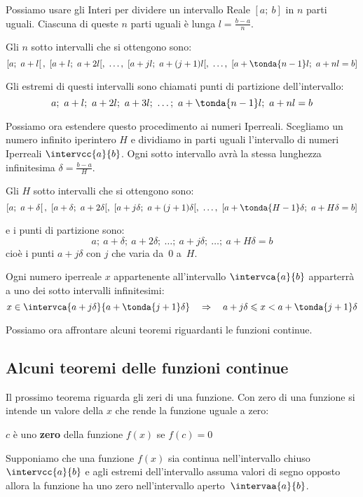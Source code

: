 Possiamo usare gli Interi per dividere un intervallo Reale \([a;~b]\)
in \(n\) parti uguali. Ciascuna di queste \(n\) parti 
uguali è lunga \(l=\frac{b-a}{n}\).

Gli \(n\) sotto intervalli che si ottengono sono:
\[\left[a;~a+l \right[,~[a+l;~a+2l[,~\dots,~
[a+jl;~a+(j+1)l[,~\dots,~
[a+\tonda{n-1}l;~a+nl=b]\]

Gli estremi di questi intervalli sono chiamati punti di partizione 
dell'intervallo:
\[a;~a+l;~a+2l;~a+3l;~\dots;~a+\tonda{n-1}l;~a+nl=b\]

Possiamo ora estendere questo procedimento ai numeri Iperreali.
Scegliamo un numero infinito iperintero \(H\) e dividiamo in parti 
uguali l'intervallo di numeri Iperreali \(\intervcc{a}{b}\). Ogni 
sotto intervallo avrà la stessa lunghezza infinitesima \(\delta=\frac{b-a}{H}\).

Gli \(H\) sotto intervalli che si ottengono sono:
\[\left[a;~a+\delta \right[,~[a+\delta;~a+2\delta[,~
[a+j\delta;~a+(j+1)\delta[,~\dots,~
[a+\tonda{H-1}\delta;~a+H\delta=b]\]

e i punti di partizione sono:
\[a;~a+\delta;~a+2\delta;~\dots;~a+j\delta;~\dots;~a+H\delta=b\]
cioè i punti \(a+j\delta\) con \(j\) che varia da~0 a~\(H\).

Ogni numero iperreale \(x\) appartenente all'intervallo \(\intervca{a}{b}\)
apparterrà a uno dei sotto intervalli infinitesimi:
\[x \in \intervca{a+j\delta}{a+\tonda{j+1}\delta} \quad \Rightarrow \quad 
  a+j\delta \leqslant x < a+\tonda{j+1}\delta\]

Possiamo ora affrontare alcuni teoremi riguardanti le funzioni continue.

\subsection{Alcuni teoremi delle funzioni continue}
\label{subsec:cont_iperinteri}

Il prossimo teorema riguarda gli zeri di una funzione. Con zero di una funzione 
si intende un valore della \(x\) che rende la funzione uguale a zero:

\begin{definizione}
 \(c\) è uno \textbf{zero} della funzione \(f(x)\) se \(f(c)=0\)
\end{definizione}

\begin{teorema}
Supponiamo che una funzione \(f(x)\) sia continua nell'intervallo chiuso
\(\intervcc{a}{b}\) e agli estremi dell'intervallo assuma valori di segno 
opposto allora la funzione ha uno zero nell'intervallo 
aperto~\(\intervaa{a}{b}\).
\end{teorema}

